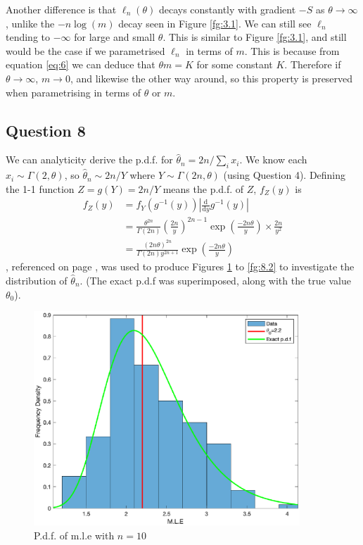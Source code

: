 \documentclass[10pt,a4paper,notitlepage]{article}
\begin{document}
Another difference is that $\ell_{n}\left(\theta\right)$ decays constantly with gradient $-S$ as $\theta\rightarrow\infty$, unlike the $-n\log\left(m\right)$ decay seen in Figure \ref{fg:3.1}. We can still see $\ell_{n}$ tending to $-\infty$ for large and small $\theta$. This is similar to Figure \ref{fg:3.1}, and still would be the case if we parametrised $\ell_{n}$ in terms of $m$. This is because from equation \eqref{eq:6} we can deduce that $\theta m=K$ for some constant $K$. Therefore if $\theta\rightarrow \infty$, $m\rightarrow 0$, and likewise the other way around, so this property is preserved when parametrising in terms of $\theta$ or $m$.

\subsection*{\centering Question 8}
We can analyticity derive the p.d.f. for $\widehat{\theta}_{n}=2n/\sum_{i} x_{i}$. We know each $x_{i}\sim \Gamma\left(2,\theta\right)$, so $\widehat{\theta}_{n}\sim 2n/Y$ where $Y\sim \Gamma\left(2n,\theta\right)$ (using Question 4). Defining the 1-1 function $Z=g\left(Y\right)=2n/Y$ means the p.d.f. of $Z$, $f_{Z}\left(y\right)$ is
\begin{equation}\label{eq:Q8PDF}
\begin{aligned}
f_{Z}\left(y\right) &= f_{Y}\left(g^{-1}\left(y\right)\right)\left| \frac{\mathrm{d}}{\mathrm{d}y}g^{-1}\left(y\right)\right|\\
&= \frac{\theta^{2n}}{\Gamma\left(2n\right)}\left(\frac{2n}{y}\right)^{2n-1}\exp\left(\frac{-2n\theta}{y}\right)\times\frac{2n}{y^2}\\
&=\frac{\left(2n\theta\right)^{2n}}{\Gamma\left(2n\right)y^{2n+1}}\exp\left(\frac{-2n\theta}{y}\right)
\end{aligned}
\end{equation}
, referenced on page \pageref{cd:8.1}, was used to produce Figures \ref{fg:8.1} to \ref{fg:8.2} to investigate the distribution of $\widehat{\theta}_{n}$. (The exact p.d.f was superimposed, along with the true value $\theta_{0}$).
\begin{figure}[H]
\centering
\includegraphics[width=10cm]{Image_8_1}
\caption{P.d.f. of m.l.e with $n=10$}\label{fg:8.1}
\end{figure}
\end{document}
